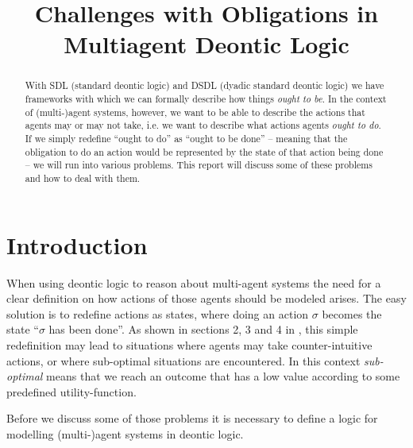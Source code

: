 \documentclass{article}
\title{Challenges with Obligations in Multiagent Deontic Logic}
\begin{document}
\maketitle
\begin{abstract}
	With SDL (standard deontic logic) and DSDL (dyadic standard deontic logic) we have frameworks with which we can formally describe how things \emph{ought to be}. In the context of (multi-)agent systems, however, we want to be able to describe the actions that agents may or may not take, i.e. we want to describe what actions agents \emph{ought to do}. If we simply redefine \enquote{ought to do} as \enquote{ought to be done} -- meaning that the obligation to do an action would be represented by the state of that action being done -- we will run into various problems. This report will discuss some of these problems and how to deal with them.
\end{abstract}

\section{Introduction}
When using deontic logic to reason about multi-agent systems the need for a clear definition on how actions of those agents should be modeled arises. The easy solution is to redefine actions as states, where doing an action $\sigma$ becomes the state \enquote{$\sigma$ has been done}. As shown in sections 2, 3 and 4 in \cite{mdl}, this simple redefinition may lead to situations where agents may take counter-intuitive actions, or where sub-optimal situations are encountered. In this context \emph{sub-optimal} means that we reach an outcome that has a low value according to some predefined utility-function.

Before we discuss some of those problems it is necessary to define a logic for modelling (multi-)agent systems in deontic logic.
\end{document}
